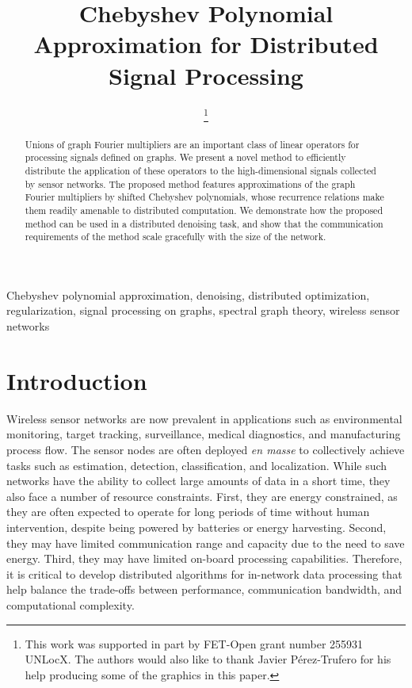 \documentclass[conference]{IEEEtran}
\title{Chebyshev Polynomial Approximation for Distributed Signal Processing}
\author{\IEEEauthorblockN{David I Shuman, Pierre Vandergheynst, and Pascal Frossard}\thanks{This work was supported in part by FET-Open grant number 255931 UNLocX. 
The authors would also like to thank Javier P{\'e}rez-Trufero for his help producing some of the graphics in this paper.}
\IEEEauthorblockA{Ecole Polytechnique F{\'e}d{\'e}rale de Lausanne (EPFL) \\ Signal Processing Laboratory \\ CH-1015 Lausanne, Switzerland \\ \{david.shuman,~pierre.vandergheynst,~pascal.frossard\}@epfl.ch}}
\begin{document}
\maketitle
\begin{abstract}
Unions of graph Fourier multipliers are an important class of linear operators for processing signals defined on graphs. We present a novel method to efficiently distribute the application of these operators to the high-dimensional signals collected by sensor networks. The proposed method
features approximations of the graph Fourier multipliers by shifted Chebyshev polynomials, whose recurrence relations make them readily amenable to distributed computation. We demonstrate how the proposed method can be used in a distributed denoising task, and show that the communication requirements of
the method scale gracefully with the size of the network. \end{abstract}
\begin{keywords}
Chebyshev polynomial approximation, denoising, distributed optimization, regularization, signal processing on graphs, spectral graph theory, wireless sensor networks
\end{keywords}
\section{Introduction}\label{sec:intro}

Wireless sensor networks are now prevalent in applications such as environmental monitoring, target
tracking, surveillance, medical diagnostics, and manufacturing process flow. The sensor nodes are often deployed \emph{en masse} to collectively achieve tasks such as estimation, detection, classification, and localization.
While such networks have the ability to collect large amounts of data in a short time, they also face a number of resource constraints. First, they are energy constrained, as they are often expected to operate for long periods of time without human intervention, despite being powered by batteries or energy harvesting. Second, they may have limited communication range and capacity due to the need to save energy. Third, they may have limited on-board processing capabilities. Therefore, it is critical to develop distributed algorithms for in-network data processing that help balance the trade-offs between performance, communication bandwidth, and computational complexity.
\end{document}
